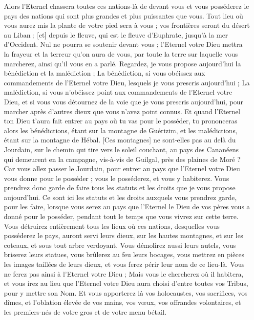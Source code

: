 \begin{multicols}{2}
Alors l'Eternel chassera toutes ces nations-là de devant vous et vous posséderez le pays des nations qui sont plus grandes et plus puissantes que vous.
Tout lieu où vous aurez mis la plante de votre pied sera à vous ; vos frontières seront du désert au Liban ; [et] depuis le fleuve, qui est le fleuve d'Euphrate, jusqu'à la mer d'Occident.
Nul ne pourra se soutenir devant vous ; l'Eternel votre Dieu mettra la frayeur et la terreur qu'on aura de vous, par toute la terre sur laquelle vous marcherez, ainsi qu'il vous en a parlé.
Regardez, je vous propose aujourd'hui la bénédiction et la malédiction ;
La bénédiction, si vous obéissez aux commandements de l'Eternel votre Dieu, lesquels je vous prescris aujourd'hui ;
La malédiction, si vous n'obéissez point aux commandements de l'Eternel votre Dieu, et si vous vous détournez de la voie que je vous prescris aujourd'hui, pour marcher après d'autres dieux que vous n'avez point connus.
Et quand l'Eternel ton Dieu t'aura fait entrer au pays où tu vas pour le posséder, tu prononceras alors les bénédictions, étant sur la montagne de Guérizim, et les malédictions, étant sur la montagne de Hébal.
[Ces montagnes] ne sont-elles pas au delà du Jourdain, sur le chemin qui tire vers le soleil couchant, au pays des Cananéens qui demeurent en la campagne, vis-à-vis de Guilgal, près des plaines de Moré ?
Car vous allez passer le Jourdain, pour entrer au pays que l'Eternel votre Dieu vous donne pour le posséder ; vous le posséderez, et vous y habiterez.
Vous prendrez donc garde de faire tous les statuts et les droits que je vous propose aujourd'hui.
\VerseOne{}Ce sont ici les statuts et les droits auxquels vous prendrez garde, pour les faire, lorsque vous serez au pays que l'Eternel le Dieu de vos pères vous a donné pour le posséder, pendant tout le temps que vous vivrez sur cette terre.
Vous détruirez entièrement tous les lieux où ces nations, desquelles vous posséderez le pays, auront servi leurs dieux, sur les hautes montagnes, et sur les coteaux, et sous tout arbre verdoyant.
Vous démolirez aussi leurs autels, vous briserez leurs statues, vous brûlerez au feu leurs bocages, vous mettrez en pièces les images taillées de leurs dieux, et vous ferez périr leur nom de ce lieu-là.
Vous ne ferez pas ainsi à l'Eternel votre Dieu ;
Mais vous le chercherez où il habitera, et vous irez au lieu que l'Eternel votre Dieu aura choisi d'entre toutes vos Tribus, pour y mettre son Nom.
Et vous apporterez là vos holocaustes, vos sacrifices, vos dîmes, et l'oblation élevée de vos mains, vos vœux, vos offrandes volontaires, et les premiers-nés de votre gros et de votre menu bétail.

\end{multicols}
